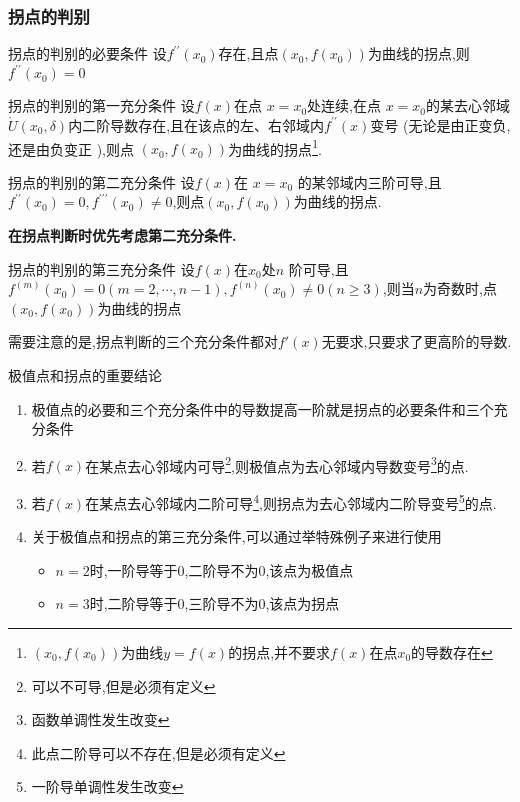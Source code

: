 \documentclass[8pt a4paper, oneside, UTF8]{ctexbook}  %
\begin{document}
\begin{sloppypar}
    \subsubsection{拐点的判别}
    \begin{defn}{拐点的判别的必要条件}{}
        设$f^{\prime\prime}(x_0)$存在,且点$(x_0,f(x_0))$为曲线的拐点,则$f^{\prime\prime}(x_0)=0$
    \end{defn}
    \begin{defn}{拐点的判别的第一充分条件}{}
        设$f(x)$在点 $x=x_0$处连续,在点 $x=x_0$的某去心邻域$\mathring U(x_0,\delta)$内二阶导数存在,且在该点的左、右邻域内$f^{\prime\prime}(x)$变号 (无论是由正变负,还是由负变正 ),则点 $(x_0,f(x_0))$为曲线的拐点\footnote{$(x_0,f(x_0))$为曲线$y=f(x)$的拐点,并不要求$f(x)$在点$x_0$的导数存在}.
    \end{defn}
    \begin{defn}{拐点的判别的第二充分条件}{}
        设$f(x)$在 $x=x_0$ 的某邻域内三阶可导,且$f^{\prime\prime}(x_0)=0,f^{\prime\prime\prime}(x_0)\neq0$,则点$(x_0,f(x_0))$为曲线的拐点.
    \end{defn}
    \textbf{在拐点判断时优先考虑第二充分条件.}
    \begin{defn}{拐点的判别的第三充分条件}{}
        设$f(x)$在$x_0$处$n$ 阶可导,且$f^{(m)}(x_0)=0(m=2,\cdots,n-1),f^{(n)}(x_0)\neq0(n\geqslant3)$,则当$n$为奇数时,点$(x_0,f(x_0))$为曲线的拐点
    \end{defn}
    需要注意的是,拐点判断的三个充分条件都对$f'(x)$无要求,只要求了更高阶的导数.
    \begin{conclusion}{极值点和拐点的重要结论}{}
        \begin{enumerate}
            \item 极值点的必要和三个充分条件中的导数提高一阶就是拐点的必要条件和三个充分条件
            \item 若$f(x)$在某点去心邻域内可导\footnote{可以不可导,但是必须有定义},则极值点为去心邻域内导数变号\footnote{函数单调性发生改变}的点.
            \item 若$f(x)$在某点去心邻域内二阶可导\footnote{此点二阶导可以不存在,但是必须有定义},则拐点为去心邻域内二阶导变号\footnote{一阶导单调性发生改变}的点.
            \item 关于极值点和拐点的第三充分条件,可以通过举特殊例子来进行使用
                  \begin{itemize}
                      \item $n=2$时,一阶导等于0,二阶导不为0,该点为极值点
                      \item $n=3$时,二阶导等于0,三阶导不为0,该点为拐点

\end{itemize}
\end{enumerate}
\end{conclusion}
\end{sloppypar}
\end{document}
